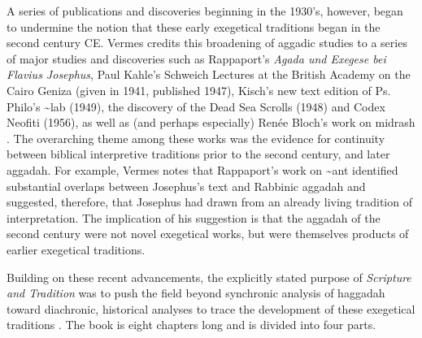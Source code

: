 A series of publications and discoveries beginning in the 1930's,
however, began to undermine the notion that these early exegetical
traditions began in the second century CE. Vermes credits this
broadening of aggadic studies to a series of major studies and
discoveries such as Rappaport's \emph{Agada und Exegese bei Flavius
Josephus},\autocite{rappaport1930} Paul Kahle's Schweich Lectures at the
British Academy on the Cairo Geniza (given in 1941, published
1947),\autocite{kahle1947} Kisch's new text edition of Ps. Philo's
\textasciitilde{}lab (1949),\autocite{kisch1949} the discovery of the
Dead Sea Scrolls (1948) and Codex Neofiti (1956), as well as (and
perhaps especially) Renée Bloch's work on midrash
\autocites{bloch1954}{bloch1955_repr}[3--7]{vermes1961}. The overarching
theme among these works was the evidence for continuity between biblical
interpretive traditions prior to the second century, and later aggadah.
For example, Vermes notes that Rappaport's work on \textasciitilde{}ant
identified substantial overlaps between Josephus's text and Rabbinic
aggadah and suggested, therefore, that Josephus had drawn from an
already living tradition of interpretation. The implication of his
suggestion is that the aggadah of the second century were not novel
exegetical works, but were themselves products of earlier exegetical
traditions.

Building on these recent advancements, the explicitly stated purpose of
\emph{Scripture and Tradition} was to push the field beyond synchronic
analysis of haggadah toward diachronic, historical analyses to trace the
development of these exegetical traditions \autocites[1]{vermes1961}[See
also][]{bloch1955_repr}. The book is eight chapters long and is divided
into four parts.

